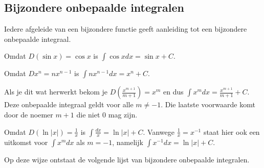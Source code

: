 \subsection{Bijzondere onbepaalde integralen}

Iedere afgeleide van een bijzondere functie geeft aanleiding tot een bijzondere onbepaalde integraal.

\begin{voorbeeld} Omdat $D(\sin x)=\cos x$ is $\int \cos x dx = \sin x +C$.
\end{voorbeeld}

\begin{voorbeeld} Omdat $Dx^n=nx^{n-1}$ is $\int nx^{n-1}dx = x^n +C$.
	
Als je dit wat herwerkt bekom je $D \left( \frac{x^{m+1}}{m+1} \right) = x^m$ en dus $\int x^mdx=\frac{x^{m+1}}{m+1} + C$.
Deze onbepaalde integraal geldt voor alle $m \neq -1$.
Die laatste voorwaarde komt door de noemer $m+1$ die niet 0 mag zijn.
\end{voorbeeld}

\begin{voorbeeld} Omdat $D(\ln\vert x \vert)=\frac{1}{x}$ is $\int \frac{dx}{x} = \ln \vert x \vert +C$.
Vanwege $\frac{1}{x} = x^{-1}$ staat hier ook een uitkomst voor $\int x^m dx$ als $m=-1$, namelijk $\int x^{-1} dx = \ln \vert x \vert +C$.
\end{voorbeeld}

Op deze wijze ontstaat de volgende lijst van bijzondere onbepaalde integralen.

